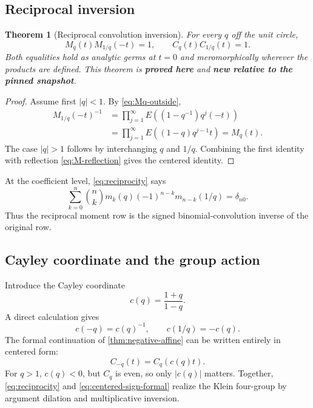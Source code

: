 \documentclass[11pt,oneside]{article}
\numberwithin{equation}{section}
\newtheorem{theorem}{Theorem}[section]
\theoremstyle{definition}
\theoremstyle{remark}
\newcommand{\proved}{\textcolor{deepgreen}{\textbf{proved here}}}
\newcommand{\auditnew}{\textcolor{deepviolet}{\textbf{new relative to the pinned snapshot}}}
\begin{document}
\subsection{Reciprocal inversion}

\begin{theorem}[Reciprocal convolution inversion]
\label{thm:reciprocity}
For every $q$ off the unit circle,
\begin{equation}
 \boxed{M_q(t)M_{1/q}(-t)=1,}
 \qquad
 \boxed{C_q(t)C_{1/q}(t)=1.}
 \label{eq:reciprocity}
\end{equation}
Both equalities hold as analytic germs at $t=0$ and meromorphically wherever
the products are defined.  This theorem is \proved{} and \auditnew.
\end{theorem}

\begin{proof}
Assume first $|q|<1$.  By \eqref{eq:Mq-outside},
\begin{align*}
 M_{1/q}(-t)^{-1}
 &=\prod_{j=1}^{\infty}
 E\!\left((1-q^{-1})q^j(-t)\right)\\
 &=\prod_{j=1}^{\infty}
 E\!\left((1-q)q^{j-1}t\right)
 =M_q(t).
\end{align*}
The case $|q|>1$ follows by interchanging $q$ and $1/q$.  Combining the first
identity with reflection \eqref{eq:M-reflection} gives the centered identity.
\end{proof}

At the coefficient level, \eqref{eq:reciprocity} says
\begin{equation}
 \sum_{k=0}^{n}\binom nk
 m_k(q)(-1)^{n-k}m_{n-k}(1/q)=\delta_{n0}.
 \label{eq:moment-convolution-inverse}
\end{equation}
Thus the reciprocal moment row is the signed binomial-convolution inverse of
the original row.

\subsection{Cayley coordinate and the group action}

Introduce the Cayley coordinate
\begin{equation}
 c(q)=\frac{1+q}{1-q}.
 \label{eq:Cayley}
\end{equation}
A direct calculation gives
\begin{equation}
 c(-q)=c(q)^{-1},
 \qquad
 c(1/q)=-c(q).
 \label{eq:Cayley-action}
\end{equation}
The formal continuation of \cref{thm:negative-affine} can be written entirely
in centered form:
\begin{equation}
 \boxed{C_{-q}(t)=C_q(c(q)t).}
 \label{eq:centered-sign-formal}
\end{equation}
For $q>1$, $c(q)<0$, but $C_q$ is even, so only $|c(q)|$ matters.
Together, \eqref{eq:reciprocity} and \eqref{eq:centered-sign-formal} realize
the Klein four-group by argument dilation and multiplicative inversion.
\end{document}
